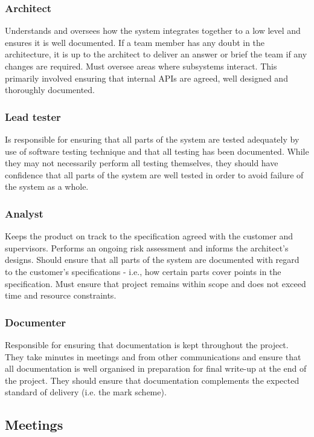 \subsubsection{Architect}
Understands and oversees how the system integrates together to a low level and ensures it is well documented. If a team member has any doubt in the architecture, it is up to the architect to deliver an answer or brief the team if any changes are required. Must oversee areas where subsystems interact. This primarily involved ensuring that internal APIs are agreed, well designed and thoroughly documented.
 
\subsubsection{Lead tester}
Is responsible for ensuring that all parts of the system are tested adequately by use of software testing technique and that all testing has been documented. While they may not necessarily perform all testing themselves, they should have confidence that all parts of the system are well tested in order to avoid failure of the system as a whole.

\subsubsection{Analyst}
Keeps the product on track to the specification agreed with the customer and supervisors. Performs an ongoing risk assessment and informs the architect's designs. Should ensure that all parts of the system are documented with regard to the customer's specifications - i.e., how certain parts cover points in the specification. Must ensure that project remains within scope and does not exceed time and resource constraints.

\subsubsection{Documenter}
Responsible for ensuring that documentation is kept throughout the project. They take minutes in meetings and from other communications and ensure that all documentation is well organised in preparation for final write-up at the end of the project. They should ensure that documentation complements the expected standard of delivery (i.e. the mark scheme).

\subsection{Meetings}
